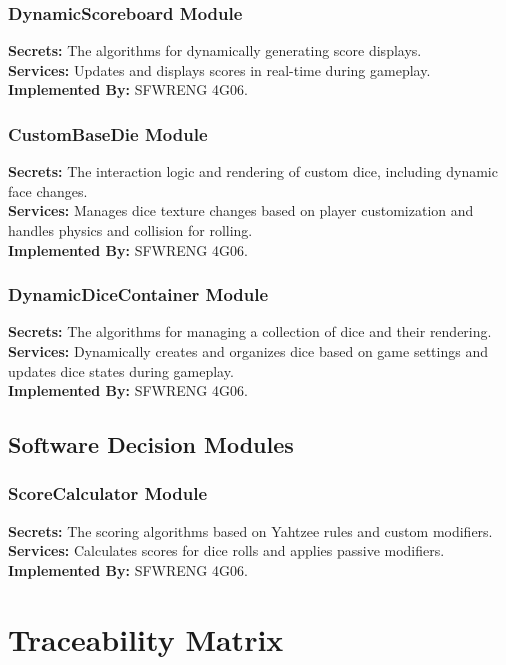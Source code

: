 \documentclass[12pt, titlepage]{article}
\begin{document}
\subsubsection{DynamicScoreboard Module}
\textbf{Secrets:} The algorithms for dynamically generating score displays.\\
\textbf{Services:} Updates and displays scores in real-time during gameplay.\\
\textbf{Implemented By:} SFWRENG 4G06.

\subsubsection{CustomBaseDie Module}
\textbf{Secrets:} The interaction logic and rendering of custom dice, including dynamic face changes.\\
\textbf{Services:} Manages dice texture changes based on player customization and handles physics and collision for rolling.\\
\textbf{Implemented By:} SFWRENG 4G06.

\subsubsection{DynamicDiceContainer Module}
\textbf{Secrets:} The algorithms for managing a collection of dice and their rendering.\\
\textbf{Services:} Dynamically creates and organizes dice based on game settings and updates dice states during gameplay.\\
\textbf{Implemented By:} SFWRENG 4G06.

\subsection{Software Decision Modules}
\subsubsection{ScoreCalculator Module}
\textbf{Secrets:} The scoring algorithms based on Yahtzee rules and custom modifiers.\\
\textbf{Services:} Calculates scores for dice rolls and applies passive modifiers.\\
\textbf{Implemented By:} SFWRENG 4G06.






\section{Traceability Matrix} \label{SecTM}
\end{document}
